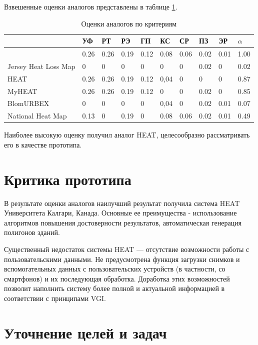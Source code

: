 	Взвешенные оценки аналогов представлены в таблице \ref{table:weightedest}.

	\begin{table}[h!]
		\begin{raggedright}
			\caption{Оценки аналогов по критериям}
			\begin{tabular}{ | l | l | l | l | l | l | l | l | l | l | }	
				\hline
				 	&УФ &РТ &РЭ &ГП &КС &СР &ПЗ &ЭР &$\alpha$\\
				\hline
					&0.26 &0.26 &0.19 &0.12 &0.08 &0.06 &0.02 &0.01 &1.00 \\
				\hline
					Jersey Heat Loss Map &0 &0 &0 &0 &0 &0 &0.02 &0 &0.02 \\
				\hline
					HEAT &0.26 &0.26 &0.19 &0.12 &0,04 &0 &0 &0 &0.87 \\
				\hline
					MyHEAT &0.26 &0.26 &0.19 &0.12 &0 &0 &0.02 &0 &0.85 \\
				\hline
					BlomURBEX &0 &0 &0 &0 &0,04 &0 &0.02 &0.01 &0.07 \\
				\hline
					National Heat Map &0.13 &0 &0.19 &0 &0.08 &0.06 &0.02 &0.01 &0.49 \\
				\hline
			\end{tabular}
			\label{table:weightedest}
		\end{raggedright}
	\end{table}

	Наиболее высокую оценку получил аналог HEAT, целесообразно рассматривать его в качестве прототипа.

\section{Критика прототипа}

\par
	В результате оценки аналогов наилучший результат получила система HEAT Университета Калгари, Канада. Основные ее преимущества - использование алгоритмов повышения достоверности результатов, автоматическая генерация полигонов зданий.
	
	Существенный недостаток системы HEAT --- отсутствие возможности работы с пользовательскими данными. Не предусмотрена функция загрузки снимков и вспомогательных данных с пользовательских устройств (в частности, со смартфонов) и их последующая обработка. Доработка этих возможностей позволит наполнить систему более полной и актуальной информацией в соответствии с принципами {VGI}. 

\section{Уточнение целей и задач}

